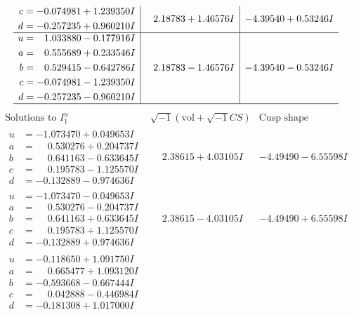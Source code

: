 \documentclass[1p]{elsarticle_modified}
\theoremstyle{definition}
\newcommand{\I}{\sqrt{-1}}
\begin{document}
$$\begin{array}{c|c|c}
\begin{aligned}
c &= -0.074981 + 1.239350 I \\
d &= -0.257235 + 0.960210 I\end{aligned}
 & \phantom{-}2.18783 + 1.46576 I & -4.39540 + 0.53246 I \\ \hline\begin{aligned}
u &= \phantom{-}1.033880 - 0.177916 I \\
a &= \phantom{-}0.555689 + 0.233546 I \\
b &= \phantom{-}0.529415 - 0.642786 I \\
c &= -0.074981 - 1.239350 I \\
d &= -0.257235 - 0.960210 I\end{aligned}
 & \phantom{-}2.18783 - 1.46576 I & -4.39540 - 0.53246 I\\
 \hline 
 \end{array}$$\newpage$$\begin{array}{c|c|c}  
\text{Solutions to }I^u_{1}& \I (\text{vol} + \sqrt{-1}CS) & \text{Cusp shape}\\
 \hline 
\begin{aligned}
u &= -1.073470 + 0.049653 I \\
a &= \phantom{-}0.530276 + 0.204737 I \\
b &= \phantom{-}0.641163 - 0.633645 I \\
c &= \phantom{-}0.195783 - 1.125570 I \\
d &= -0.132889 - 0.974636 I\end{aligned}
 & \phantom{-}2.38615 + 4.03105 I & -4.49490 - 6.55598 I \\ \hline\begin{aligned}
u &= -1.073470 - 0.049653 I \\
a &= \phantom{-}0.530276 - 0.204737 I \\
b &= \phantom{-}0.641163 + 0.633645 I \\
c &= \phantom{-}0.195783 + 1.125570 I \\
d &= -0.132889 + 0.974636 I\end{aligned}
 & \phantom{-}2.38615 - 4.03105 I & -4.49490 + 6.55598 I \\ \hline\begin{aligned}
u &= -0.118650 + 1.091750 I \\
a &= \phantom{-}0.665477 + 1.093120 I \\
b &= -0.593668 - 0.667444 I \\
c &= \phantom{-}0.042888 - 0.446984 I \\
d &= -0.181308 + 1.017000 I\end{aligned}

\end{array}$$
\end{document}
